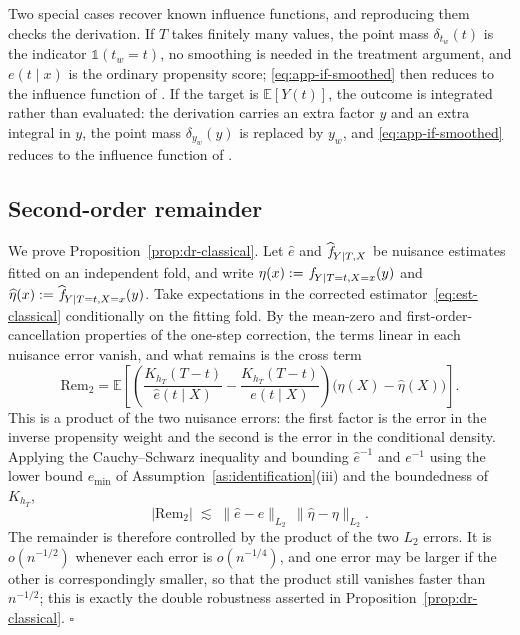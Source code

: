 \documentclass[11pt]{article}
\theoremstyle{plain}
\theoremstyle{definition}
\theoremstyle{remark}
\newcommand{\pE}{\ensuremath{\mathbb{E}}}
\newcommand{\pf}[1]{\ensuremath{\,\mathlarger{\textit{f}}_{#1}}}
\newcommand{\pfhat}[1]{\ensuremath{\,\mathlarger{\widehat{\textit{f}}}_{#1}}}
\newcommand{\Indi}{\ensuremath{\mathds{1}}}
\newcommand{\gps}{e}
\newcommand{\Rem}{\mathrm{Rem}}
\begin{document}
Two special cases recover known influence functions, and reproducing them checks the
derivation. If $T$ takes finitely many values, the point mass $\delta_{t_w}(t)$ is the
indicator $\Indi(t_w = t)$, no smoothing is needed in the treatment argument, and
$\gps(t \mid x)$ is the ordinary propensity score; \eqref{eq:app-if-smoothed} then reduces to
the influence function of \citet{kennedy2023density}. If the target is $\pE[Y(t)]$, the outcome
is integrated rather than evaluated: the derivation carries an extra factor $y$ and an extra
integral in $y$, the point mass $\delta_{y_w}(y)$ is replaced by $y_w$, and
\eqref{eq:app-if-smoothed} reduces to the influence function of \citet{kennedy2017continuous}.

\subsection{Second-order remainder}
\label{app:classical-remainder}

We prove Proposition~\ref{prop:dr-classical}. Let $\widehat\gps$ and $\pfhat{Y \mid T,X}$ be
nuisance estimates fitted on an independent fold, and write $\eta(x) := \pf{Y \mid T=t,X=x}(y)$
and $\widehat\eta(x) := \pfhat{Y \mid T=t,X=x}(y)$. Take expectations in the corrected
estimator~\eqref{eq:est-classical} conditionally on the fitting fold. By the mean-zero and
first-order-cancellation properties of the one-step correction, the terms linear in each
nuisance error vanish, and what remains is the cross term
\begin{equation}
\Rem_2
= \pE\!\left[
\left( \frac{K_{h_T}(T-t)}{\widehat\gps(t \mid X)}
- \frac{K_{h_T}(T-t)}{\gps(t \mid X)} \right)
\Big( \eta(X) - \widehat\eta(X) \Big)
\right].
\label{eq:app-remainder}
\end{equation}
This is a product of the two nuisance errors: the first factor is the error in the inverse
propensity weight and the second is the error in the conditional density. Applying the
Cauchy--Schwarz inequality and bounding $\widehat\gps^{-1}$ and $\gps^{-1}$ using the lower
bound $\gps_{\min}$ of Assumption~\ref{as:identification}(iii) and the boundedness of $K_{h_T}$,
\[
|\Rem_2| \;\lesssim\; \big\| \widehat\gps - \gps \big\|_{L_2}\,
\big\| \widehat\eta - \eta \big\|_{L_2} .
\]
The remainder is therefore controlled by the product of the two $L_2$ errors. It is
$o(n^{-1/2})$ whenever each error is $o(n^{-1/4})$, and one error may be larger if the other is
correspondingly smaller, so that the product still vanishes faster than $n^{-1/2}$; this is
exactly the double robustness asserted in Proposition~\ref{prop:dr-classical}. \hfill$\square$
\end{document}
